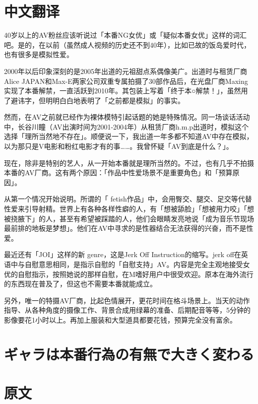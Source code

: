 \documentclass[12pt,UTF8]{ctexbook}
\begin{document}
\switchcolumn

\section*{中文翻译}

40岁以上的AV粉丝应该听说过「本番NG女优」或「疑似本番女优」这样的词汇吧。是的，在以前（虽然成人视频的历史还不到40年），比如已故的饭岛爱时代，也有很多是模拟性爱。

2000年以后印象深刻的是2005年出道的元祖甜点系偶像美广。出道时与租赁厂商Alice JAPAN和Max-E两家公司双重专属拍摄了30部作品后，在光盘厂商Maxing实现了本番解禁，一直活跃到2010年。其包装上写着「终于本○解禁！」，虽然用了避讳字，但明明白白地表明了「之前都是模拟」的事实。

然而，在AV之前就已经作为裸体模特引起话题的她是特殊情况。同一场谈话活动中，长谷川瞳（AV出演时间为2001-2004年）从租赁厂商h.m.p出道时，模拟这个选择「理所当然地不存在」。顺便说一下，我出道一年多都不知道AV中存在模拟，以为那只是V电影和粉红电影才有的事……。我曾怀疑「AV到底是什么？」。

现在，除非是特别的艺人，从一开始本番就是理所当然的。不过，也有几乎不拍摄本番的AV厂商。这有两个原因：「作品中性爱场景不是重要角色」和「预算原因」。

从第一个情况开始说明。所谓的「 fetish作品」中，会用臀交、腿交、足交等代替性爱来引导射精。世界上有各种各样性癖的人，有「想被舔脸」「想被用力咬」「想被挠腋下」的人，甚至有希望被踩踏的人，他们会眼睛发亮地说「成为音乐节现场最前排的地板是梦想」。他们在AV中寻求的是性器结合无法获得的兴奋，而不是性爱。

最近还有「JOI」这样的新 genre，这是Jerk Off Instruction的缩写。jerk off在英语中与自慰意思相同，是指示自慰的「自慰支持」AV。内容是完全主观地接受女优的自慰指示，按照她说的那样自慰，在M嗜好用户中很受欢迎。原本在海外流行的东西现在普及了，但这也不需要本番就能成立。

另外，唯一的特摄AV厂商，比起色情展开，更花时间在格斗场景上。当天的动作指导、从各种角度的摄像工作、背景合成用绿幕的准备、后期配音等等，5分钟的影像要花1小时以上。再加上服装和大型道具都要花钱，预算完全没有富余。

\switchcolumn

\section{ギャラは本番行為の有無で大きく変わる}

\switchcolumn

\section*{原文}
\end{document}
